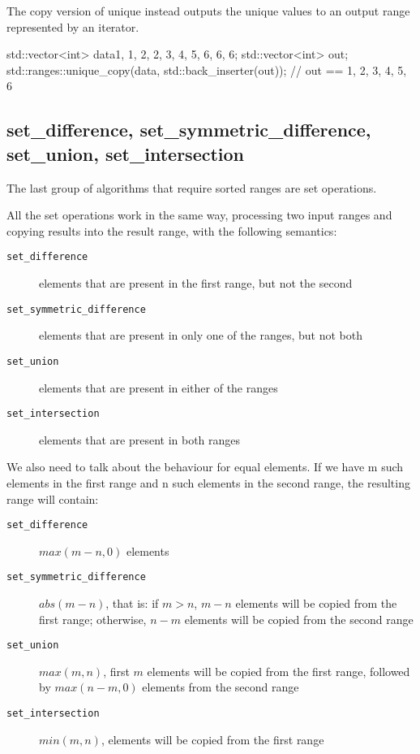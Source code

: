The copy version of unique instead outputs the unique values to an output range represented by an iterator.

\begin{box-note}
\begin{cppcode}
std::vector<int> data{1, 1, 2, 2, 3, 4, 5, 6, 6, 6};
std::vector<int> out;
std::ranges::unique_copy(data, std::back_inserter(out));
// out == {1, 2, 3, 4, 5, 6}
\end{cppcode}
\end{box-note}

\subsection{set\_difference, set\_symmetric\_difference, set\_union, set\_intersection}

The last group of algorithms that require sorted ranges are set operations.


All the set operations work in the same way, processing two input ranges and copying results into the result range, with the following semantics:

\begin{description}
   \item[\texttt{set\_difference}] elements that are present in the first range, but not the second
   \item[\texttt{set\_symmetric\_difference}] elements that are present in only one of the ranges, but not both
   \item[\texttt{set\_union}] elements that are present in either of the ranges
   \item[\texttt{set\_intersection}] elements that are present in both ranges
\end{description}

We also need to talk about the behaviour for equal elements. If we have m such elements in the first range and n such elements in the second range, the resulting range will contain:


\begin{description}
   \item[\texttt{set\_difference}] $max(m-n,0)$ elements
   \item[\texttt{set\_symmetric\_difference}] $abs(m-n)$, that is: if $m>n$, $m-n$ elements will be copied from the first range; otherwise, $n-m$ elements will be copied from the second range
   \item[\texttt{set\_union}] $max(m,n)$, first $m$ elements will be copied from the first range, followed by $max(n-m,0)$ elements from the second range
   \item[\texttt{set\_intersection}] $min(m,n)$, elements will be copied from the first range
\end{description}

